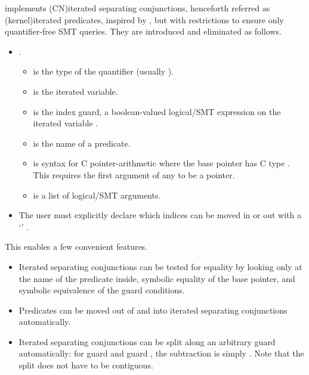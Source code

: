  implements \kl(CN){iterated separating conjunctions}, henceforth referred as
\intro(kernel){iterated predicates}, inspired by ,
but with restrictions to ensure only quantifier-free SMT queries. They are
introduced and eliminated as follows.
\begin{itemize}
\item {}. %
\begin{itemize}
    \item \sm{\beta} is the type of the quantifier (usually %
        ).
    \item {} is the iterated variable. \item {} is the index
        guard, a boolean-valued logical/SMT expression on the iterated variable
        .
    \item \sm{{ \alpha }} is the name of a predicate.
    \item {} is  syntax for C %
        pointer-arithmetic  where the base pointer 
        has C type \sm{\tau  \cnsym{*}}. This requires the first argument of any
        \sm{{ \alpha }} to be a pointer.
    \item {} is a list of logical/SMT arguments.
\end{itemize}
\item The user must explicitly declare which indices can be moved in or out
    with a `'
    .
\end{itemize}

This enables a few convenient features.
\begin{itemize}
    \item Iterated separating conjunctions can be tested for equality by
        looking only at the name of the predicate inside, symbolic
        equality of the base pointer, and symbolic equivalence of the guard
        conditions.
    \item Predicates can be moved out of and into iterated separating conjunctions
        automatically.
    \item Iterated separating conjunctions can be split along an arbitrary
        guard automatically:
        for guard  and guard
        ,
        the subtraction is simply . Note that the split %
        does not have to be contiguous.
\end{itemize}

